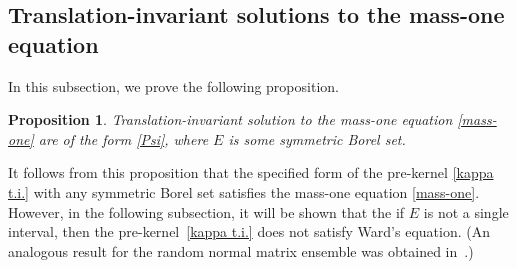 \documentclass[pdftex]{sigma}
\numberwithin{equation}{section}
\newtheorem{Proposition}[Theorem]{Proposition}
 { \theoremstyle{definition}
\newtheorem{Definition}[Theorem]{Definition}
\newtheorem{Example}[Theorem]{Example}
\newtheorem{Remark}[Theorem]{Remark} }
\newcommand{\1}{\chi}
\begin{document}
\subsection{Translation-invariant solutions to the mass-one equation}
In this subsection, we prove the following proposition.

\begin{Proposition}\label{Prop_mass1 TIsol}
	Translation-invariant solution to the mass-one equation \eqref{mass-one} are of the form \eqref{Psi}, where $E$ is some symmetric Borel set.
\end{Proposition}

It follows from this proposition that the specified form of the pre-kernel \eqref{kappa t.i.} with any symmetric Borel set satisfies the mass-one equation \eqref{mass-one}.
However, in the following subsection, it will be shown that the if $E$ is not a single interval, then the pre-kernel~\eqref{kappa t.i.} does not satisfy Ward's equation.
(An analogous result for the random normal matrix ensemble was obtained in~\cite{MR4030288}.)
\end{document}
